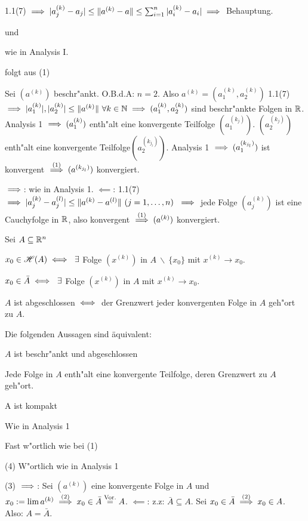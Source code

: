 \documentclass[a4paper,twoside,DIV15,BCOR12mm,chapterprefix=true,headings=twolinechapter]{scrbook}
\begin{document}
\begin{beweise}
  \item 1.1(7) $\implies |a_j^{(k)} - a_j| \le \|a^{(k)}-a\| \le \sum_{i=1}^n|a_i^{(k)} - a_i| \implies $ Behauptung.
  \item und
  \item wie in Analysis I.
  \item folgt aus (1)
  \item Sei $(a^{(k)})$ beschr"ankt. O.B.d.A: $n=2$. Also $a^{(k)}=(a_1^{(k)},a_2^{(k)})$ 1.1(7) $\implies |a_1^{(k)}|,|a_2^{(k)}|\le\|a^{(k)}\|\ \forall k\in\mathbb{N} \implies (a_1^{(k)},a_2^{(k)})$ sind beschr"ankte Folgen in $\mathbb{R}$. Analysis 1 $\implies (a_1^{(k)})$ enth"alt eine konvergente Teilfolge $(a_1^{(k_j)})$. $(a_2^{(k_j)})$ enth"alt eine konvergente Teilfolge$ (a_2^{(k_{j_l})})$. Analysis 1 $\implies (a_1^{(k_{j_l})})$ ist konvergent $\overset{(1)}{\implies} (a^{(k_{j_l})})$ konvergiert.
  \item \glqq$\implies$\grqq: wie in Analysis 1. \glqq$\impliedby$\grqq: 1.1(7) $\implies |a_j^{(k)}-a_j^{(l)}| \le \|a^{(k)}-a^{(l)}\|\ (j=1,\ldots,n)\ \implies$ jede Folge $(a_j^{(k)})$ ist eine Cauchyfolge in $\mathbb{R}$, also konvergent $\overset{(1)}{\implies} (a^{(k)})$ konvergiert.
\end{beweise}

\begin{satz}
Sei $A\subseteq\mathbb{R}^n$
\begin{liste}
\item $x_0 \in \mathscr{H}(A)\iff\ \exists$ Folge $(x^{(k)})$ in $A\ \backslash\ \{x_0\}$ mit $x^{(k)}\to x_0$.
\item $x_0 \in \bar A\iff\ \exists$ Folge $(x^{(k)})$ in $A$ mit $x^{(k)}\to x_0$.
\item $A$ ist abgeschlossen $\iff$ der Grenzwert jeder konvergenten Folge in $A$ geh"ort zu $A$.
\item Die folgenden Aussagen sind äquivalent:
    \begin{liste}
        \item $A$ ist beschr"ankt und abgeschlossen 
        \item Jede Folge in $A$ enth"alt eine konvergente Teilfolge, deren Grenzwert zu $A$ geh"ort.
        \item A ist kompakt
    \end{liste}
\end{liste}
\end{satz}

\begin{beweise}
\item Wie in Analysis 1
\item Fast w"ortlich wie bei (1)
\item[(4)] W"ortlich wie in Analysis 1
\item[(3)] \glqq$\implies$\grqq: Sei $(a^{(k)})$ eine konvergente Folge in $A$ und $x_0:=\lim a^{(k)} \overset{(2)}{\implies} x_0 \in \bar A \overset{\text{Vor.}}{=}A$. \glqq$\impliedby$\grqq: z.z: $\bar A \subseteq A$. Sei $x_0 \in \bar A \overset{(2)}{\implies}x_0 \in A$. Also: $A=\bar A$.
\end{beweise}
\end{document}
